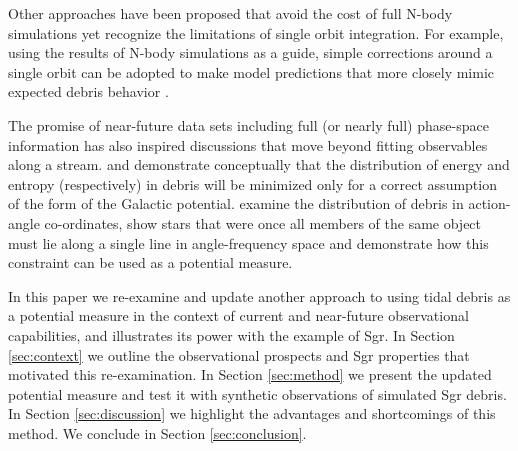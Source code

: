 \documentclass[preprint]{aastex}
\begin{document}
Other approaches have been proposed that avoid the cost of full N-body simulations yet recognize the limitations of single orbit integration.
For example, using the results of N-body simulations as a guide, simple corrections around a single orbit can be adopted to make model predictions that more closely
mimic expected debris behavior \citep[e.g.][]{johnston99b,varghese11}.

The promise of near-future data sets including full (or nearly full) phase-space information has also inspired discussions that move beyond fitting observables along a
stream.
\citet{binney08} and \citet{penarrubia12} demonstrate conceptually that the distribution of energy and entropy (respectively) in debris will be minimized only for a correct
assumption of the form of the Galactic potential.
\citet{sanders13b} examine the distribution of debris in action-angle co-ordinates, show stars that were once all members of the same object must lie along a single line in angle-frequency space and demonstrate how this constraint can be used as a potential measure.

In this paper we re-examine and update  another approach to using tidal debris as a potential measure \citep[originially proposed by][]{johnston99a}  in the context of current and near-future observational capabilities, and illustrates its power with the example of Sgr.
In Section \ref{sec:context} we outline the observational prospects and Sgr properties that motivated this re-examination.
In Section \ref{sec:method} we present the updated potential measure and test it with synthetic observations of simulated Sgr debris.
In Section \ref{sec:discussion} we highlight the advantages and shortcomings of this method.
We conclude in Section \ref{sec:conclusion}.

%
\end{document}
